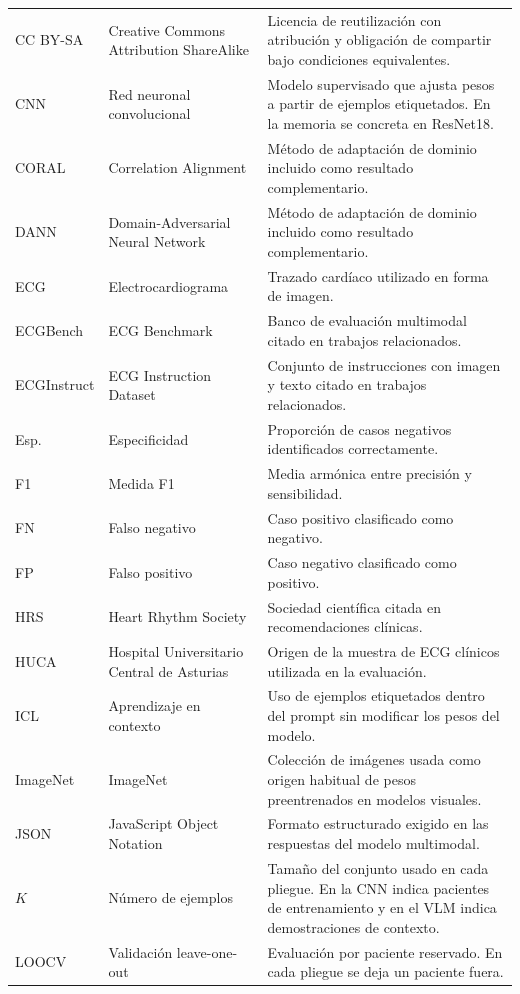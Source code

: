{\begin{longtable}{@{}>{\raggedright\arraybackslash}p{2.20cm}>{\raggedright\arraybackslash}p{4.10cm}>{\raggedright\arraybackslash}p{7.95cm}@{}}
CC BY-SA & Creative Commons Attribution ShareAlike & Licencia de reutilización con atribución y obligación de compartir bajo condiciones equivalentes. \\
CNN & Red neuronal convolucional & Modelo supervisado que ajusta pesos a partir de ejemplos etiquetados. En la memoria se concreta en ResNet18. \\
CORAL & Correlation Alignment & Método de adaptación de dominio incluido como resultado complementario. \\
DANN & Domain-Adversarial Neural Network & Método de adaptación de dominio incluido como resultado complementario. \\
ECG & Electrocardiograma & Trazado cardíaco utilizado en forma de imagen. \\
ECGBench & ECG Benchmark & Banco de evaluación multimodal citado en trabajos relacionados. \\
ECGInstruct & ECG Instruction Dataset & Conjunto de instrucciones con imagen y texto citado en trabajos relacionados. \\
Esp. & Especificidad & Proporción de casos negativos identificados correctamente. \\
F1 & Medida F1 & Media armónica entre precisión y sensibilidad. \\
FN & Falso negativo & Caso positivo clasificado como negativo. \\
FP & Falso positivo & Caso negativo clasificado como positivo. \\
HRS & Heart Rhythm Society & Sociedad científica citada en recomendaciones clínicas. \\
HUCA & Hospital Universitario Central de Asturias & Origen de la muestra de ECG clínicos utilizada en la evaluación. \\
ICL & Aprendizaje en contexto & Uso de ejemplos etiquetados dentro del prompt sin modificar los pesos del modelo. \\
ImageNet & ImageNet & Colección de imágenes usada como origen habitual de pesos preentrenados en modelos visuales. \\
JSON & JavaScript Object Notation & Formato estructurado exigido en las respuestas del modelo multimodal. \\
\(K\) & Número de ejemplos & Tamaño del conjunto usado en cada pliegue. En la CNN indica pacientes de entrenamiento y en el VLM indica demostraciones de contexto. \\
LOOCV & Validación leave-one-out & Evaluación por paciente reservado. En cada pliegue se deja un paciente fuera. \\

\end{longtable}}
